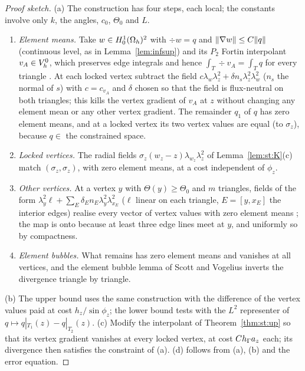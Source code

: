 \begin{proof}[Proof sketch]
(a) The construction has four steps, each local; the constants involve only $k$, the angles, $c_0$, $\Theta_0$ and $L$.
\begin{enumerate}[label=\Alph*.]
\item \emph{Element means.} Take $w\in H^1_0(\Omega_h)^2$ with $\div w=q$ and $\lVert \nabla w\rVert\le C\lVert q\rVert$ (continuous level, as in Lemma~\ref{lem:infsup}) and its $P_2$ Fortin interpolant $v_A\in V_h^0$, which preserves edge integrals and hence $\int_T\div v_A=\int_Tq$ for every triangle \cite{GiraultRaviart}. At each locked vertex subtract the field $c\lambda_w\lambda_z^2+\delta n_s\lambda_z^2\lambda_w^2$ ($n_s$ the normal of $s$) with $c=c_{v_A}$ and $\delta$ chosen so that the field is flux-neutral on both triangles; this kills the vertex gradient of $v_A$ at $z$ without changing any element mean or any other vertex gradient. The remainder $q_1$ of $q$ has zero element means, and at a locked vertex its two vertex values are equal (to $\sigma_z$), because $q\in$ the constrained space.
\item \emph{Locked vertices.} The radial fields $\sigma_z(w_z-z)\lambda_{w_z}\lambda_z^2$ of Lemma~\ref{lem:st:K}(c) match $(\sigma_z,\sigma_z)$, with zero element means, at a cost independent of $\phi_z$.
\item \emph{Other vertices.} At a vertex $y$ with $\Theta(y)\ge\Theta_0$ and $m$ triangles, fields of the form $\lambda_y^2\ell+\sum_E\delta_En_E\lambda_y^2\lambda_{x_E}^2$ ($\ell$ linear on each triangle, $E=[y,x_E]$ the interior edges) realise every vector of vertex values with zero element means \cite{GuzmanScott2019,PadhiExt}; the map is onto because at least three edge lines meet at $y$, and uniformly so by compactness.
\item \emph{Element bubbles.} What remains has zero element means and vanishes at all vertices, and the element bubble lemma of Scott and Vogelius \cite{ScottVogelius1985} inverts the divergence triangle by triangle.
\end{enumerate} (b) The upper bound uses the same construction with the difference of the vertex values paid at cost $h_z/\sin\phi_z$; the lower bound tests with the $L^2$ representer of $q\mapsto q|_{T_1}(z)-q|_{T_2}(z)$. (c) Modify the interpolant of Theorem~\ref{thm:st:up} so that its vertex gradient vanishes at every locked vertex, at cost $Ch_\Gamma a_z$ each; its divergence then satisfies the constraint of (a). (d) follows from (a), (b) and the error equation.
\end{proof}

